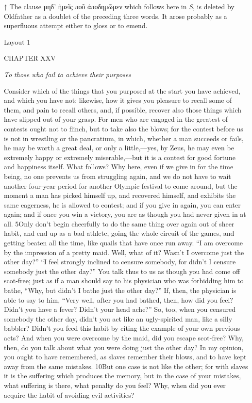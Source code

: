 

↑ The clause μηδ' ἡμεῖς ποῦ ἀποδημῶμεν which follows here in \emph{S}, is deleted by Oldfather as a doublet of the preceding three words. It arose probably as a superfluous attempt either to gloss or to emend.


Layout 1

CHAPTER XXV

\emph{To those who fail to achieve their purposes}

Consider which of the things that you purposed at the start you have achieved, and which you have not; likewise, how it gives you pleasure to recall some of them, and pain to recall others, and, if possible, recover also those things which have slipped out of your grasp. For men who are engaged in the greatest of contests ought not to flinch, but to take also the blows; for the contest before us is not in wrestling or the pancratium, in which, whether a man succeeds or fails, he may be worth a great deal, or only a little,—yes, by Zeus, he may even be extremely happy or extremely miserable,—but it is a contest for good fortune and happiness itself. What follows? Why here, even if we give in for the time being, no one prevents us from struggling again, and we do not have to wait another four-year period for another Olympic festival to come around, but the moment a man has picked himself up, and recovered himself, and exhibits the same eagerness, he is allowed to contest; and if you give in again, you can enter again; and if once you win a victory, you are as though you had never given in at all. 5Only don't begin cheerfully to do the same thing over again out of sheer habit, and end up as a bad athlete, going the whole circuit of the games, and getting beaten all the time, like quails that have once run away. ``I am overcome by the impression of a pretty maid. Well, what of it? Wasn't I overcome just the other day?'' ``I feel strongly inclined to censure somebody, for didn't I censure somebody just the other day?'' You talk thus to us as though you had come off scot-free; just as if a man should say to his physician who was forbidding him to bathe, ``Why, but didn't I bathe just the other day?'' If, then, the physician is able to say to him, ``Very well, after you had bathed, then, how did you feel? Didn't you have a fever? Didn't your head ache?'' So, too, when you censured somebody the other day, didn't you act like an ugly-spirited man, like a silly babbler? Didn't you feed this habit by citing the example of your own previous acts? And when you were overcome by the maid, did you escape scot-free? Why, then, do you talk about what you were doing just the other day? In my opinion, you ought to have remembered, as slaves remember their blows, and to have kept away from the same mistakes. 10But one case is not like the other; for with slaves it is the suffering which produces the memory, but in the case of your mistakes, what suffering is there, what penalty do you feel? Why, when did you ever acquire the habit of avoiding evil activities?


